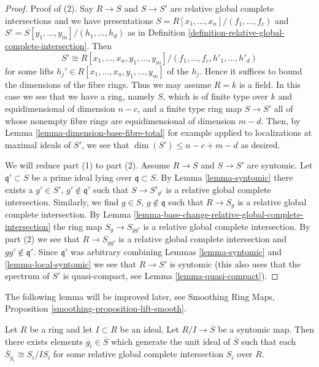 \begin{proof}
Proof of (2). Say $R \to S$ and $S \to S'$ are relative global complete
intersections and we have presentations
$S =  R[x_1, \ldots, x_n]/(f_1, \ldots, f_c)$ and
$S' = S[y_1, \ldots, y_m]/(h_1, \ldots, h_d)$ as in
Definition \ref{definition-relative-global-complete-intersection}.
Then
$$
S' \cong
R[x_1, \ldots, x_n, y_1, \ldots, y_m]/(f_1, \ldots, f_c, h'_1, \ldots, h'_d)
$$
for some lifts $h_j' \in R[x_1, \ldots, x_n, y_1, \ldots, y_m]$ of the $h_j$.
Hence it suffices to bound the dimensions of the fibre rings.
Thus we may assume $R = k$ is a field.
In this case we see that we have a ring, namely $S$, which is of finite
type over $k$ and equidimensional of dimension $n - c$, and a
finite type ring map $S \to S'$ all of whose nonempty fibre
rings are equidimensional of dimension $m - d$. Then, by
Lemma \ref{lemma-dimension-base-fibre-total} for example applied
to localizations at maximal ideals of $S'$, we see that
$\dim(S') \leq n - c + m - d$ as desired.

\medskip\noindent
We will reduce part (1) to part (2). Assume $R \to S$ and $S \to S'$
are syntomic. Let $\mathfrak q' \subset S$ be a prime ideal lying
over $\mathfrak q \subset S$. By Lemma \ref{lemma-syntomic}
there exists a $g' \in S'$, $g' \not \in \mathfrak q'$ such that
$S \to S'_{g'}$ is a relative global complete intersection.
Similarly, we find $g \in S$, $g \not \in \mathfrak q$ such that
$R \to S_g$ is a relative global complete intersection.
By Lemma \ref{lemma-base-change-relative-global-complete-intersection}
the ring map $S_g \to S_{gg'}$ is a relative global complete intersection.
By part (2) we see that $R \to S_{gg'}$ is a relative global
complete intersection and $gg' \not \in \mathfrak q'$.
Since $\mathfrak q'$ was arbitrary
combining Lemmas \ref{lemma-syntomic} and \ref{lemma-local-syntomic}
we see that $R \to S'$ is syntomic (this also uses that the spectrum
of $S'$ is quasi-compact, see Lemma \ref{lemma-quasi-compact}).
\end{proof}

\noindent
The following lemma will be improved later, see
Smoothing Ring Maps, Proposition \ref{smoothing-proposition-lift-smooth}.

\begin{lemma}
\label{lemma-lift-syntomic}
Let $R$ be a ring and let $I \subset R$ be an ideal.
Let $R/I \to \overline{S}$ be a syntomic map.
Then there exists elements $\overline{g}_i \in \overline{S}$
which generate the unit ideal of $\overline{S}$
such that each $\overline{S}_{g_i} \cong S_i/IS_i$
for some relative global complete intersection $S_i$
over $R$.
\end{lemma}

